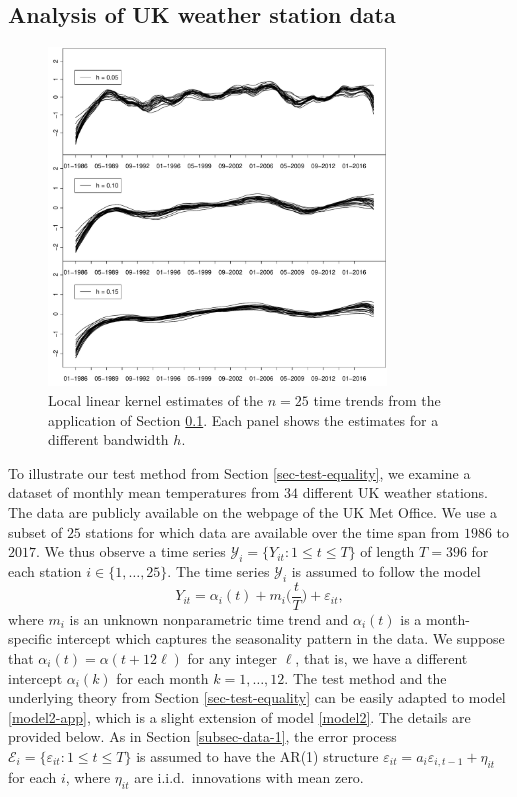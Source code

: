 \subsection{Analysis of UK weather station data}\label{subsec-data-2} 


\begin{figure}[t]
\centering
\includegraphics[width=0.8\textwidth]{Plots/stations_data.pdf}
\vspace{0.2cm}
\caption{Local linear kernel estimates of the $n=25$ time trends from the application of Section \ref{subsec-data-2}. Each panel shows the estimates for a different bandwidth $h$.}\label{plot-results-app2}
\end{figure}


To illustrate our test method from Section \ref{sec-test-equality}, we examine a dataset of monthly mean temperatures from $34$ different UK weather stations. The data are publicly available on the webpage of the UK Met Office. We use a subset of $25$ stations for which data are available over the time span from $1986$ to $2017$. We thus observe a time series $\mathcal{Y}_i = \{Y_{it}: 1 \le t \le T \}$ of length $T = 396$ for each station $i \in \{1,\ldots,25\}$. The time series $\mathcal{Y}_i$ is assumed to follow the model 
\begin{equation}\label{model2-app}
Y_{it} = \alpha_i(t) + m_i\Big(\frac{t}{T}\Big) + \varepsilon_{it}, 
\end{equation}
where $m_i$ is an unknown nonparametric time trend and $\alpha_i(t)$ is a month-specific intercept which captures the seasonality pattern in the data. We suppose that $\alpha_i(t) = \alpha(t + 12 \ell)$ for any integer $\ell$, that is, we have a different intercept $\alpha_i(k)$ for each month $k = 1,\ldots,12$. The test method and the underlying theory from Section \ref{sec-test-equality} can be easily adapted to model \eqref{model2-app}, which is a slight extension of model \eqref{model2}. The details are provided below. As in Section \ref{subsec-data-1}, the error process $\mathcal{E}_i = \{ \varepsilon_{it}: 1 \le t \le T \}$ is assumed to have the AR(1) structure $\varepsilon_{it} = a_i \varepsilon_{i,t-1} + \eta_{it}$ for each $i$, where $\eta_{it}$ are i.i.d.\ innovations with mean zero.  


